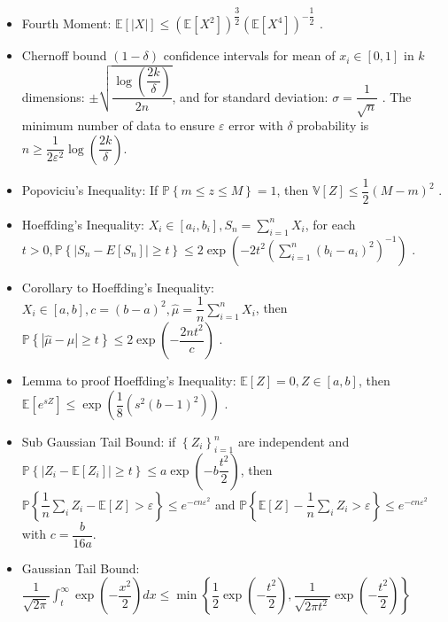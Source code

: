\documentclass{article}
\begin{document}
\begin{itemize}
\item Fourth Moment: $\mathbb{E}\left[| X |\right] \leq  \left(\mathbb{E}\left[X^{2}\right]\right)^{\dfrac{3}{2}} \left(\mathbb{E}\left[X^{4}\right]\right)^{- \dfrac{1}{2}}$ .
\item Chernoff bound $\left(1 - \delta\right)$ confidence intervals for mean of $x_{i} \in \left[0, 1\right]$ in $k $ dimensions: $\pm \sqrt{\dfrac{\log\left(\dfrac{2 k}{\delta}\right)}{2 n}}$, and for standard deviation: $\sigma = \dfrac{1}{\sqrt{n}}$ . The minimum number of data to ensure $\varepsilon$ error with $\delta$ probability is $n  \geq  \dfrac{1}{2 \varepsilon^{2}} \log\left(\dfrac{2 k}{\delta}\right)$.
\item Popoviciu's Inequality: If $\mathbb{P}\left\{m \leq  z \leq  M\right\} = 1$, then $\mathbb{V}\left[Z\right] \leq  \dfrac{1}{2} \left(M - m\right)^{2}$ .
\item Hoeffding's Inequality: $X_{i} \in \left[a_{i}, b_{i}\right], S_{n} = \displaystyle\sum_{i=1}^{n} X_{i}$, for each $t  > 0, \mathbb{P}\left\{| S_{n} - E\left[S_{n}\right] | \geq  t\right\} \leq  2 \exp\left(- 2 t^{2} \left(\displaystyle\sum_{i=1}^{n} \left(b_{i} - a_{i}\right)^{2}\right)^{-1}\right)$ .
\item Corollary to Hoeffding's Inequality: $X_{i} \in \left[a, b\right], c  = \left(b - a\right)^{2}, \hat{\mu} = \dfrac{1}{n} \displaystyle\sum_{i=1}^{n} X_{i}$, then $\mathbb{P}\left\{ | \hat{\mu} - \mu | \geq  t \right\} \leq  2 \exp\left(- \dfrac{2 n t^{2}}{c}\right)$ .
\item Lemma to proof Hoeffding's Inequality: $\mathbb{E}\left[Z\right] = 0, Z  \in \left[a, b\right]$, then $\mathbb{E}\left[e^{s Z}\right] \leq  \exp\left(\dfrac{1}{8} \left(s^{2} \left(b - 1\right)^{2}\right)\right)$ .
\item Sub Gaussian Tail Bound: if $\left\{Z_{i}\right\}_{i=1}^{n}$ are independent and $\mathbb{P}\left\{|Z_{i} - \mathbb{E}\left[Z_{i}\right]| \geq  t\right\} \leq  a \exp\left(-b \dfrac{t^{2}}{2}\right)$, then $\mathbb{P}\left\{\dfrac{1}{n} \displaystyle\sum_{i} Z_{i} - \mathbb{E}\left[Z\right] > \varepsilon\right\} \leq  e^{-c n \varepsilon^{2}}$ and $\mathbb{P}\left\{\mathbb{E}\left[Z\right] - \dfrac{1}{n} \displaystyle\sum_{i} Z_{i} > \varepsilon\right\} \leq  e^{-c n \varepsilon^{2}}$ with $c  = \dfrac{b}{16 a}$.
\item Gaussian Tail Bound: $\dfrac{1}{\sqrt{2 \pi}} \displaystyle\int_{t}^{\infty} \exp\left(- \dfrac{x^{2}}{2}\right) dx \leq  \displaystyle\min\left\{\dfrac{1}{2} \exp\left(- \dfrac{t^{2}}{2}\right), \dfrac{1}{\sqrt{2 \pi t^{2}}} \exp\left(- \dfrac{t^{2}}{2}\right)\right\}$

\end{itemize}
\end{document}
